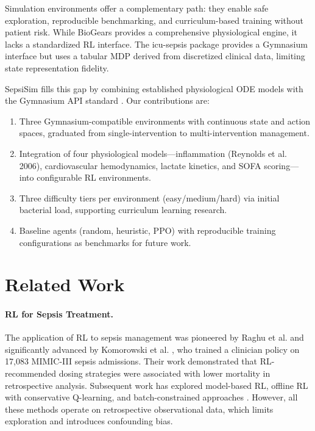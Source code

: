 \documentclass[11pt,a4paper]{article}
\begin{document}
Simulation environments offer a complementary path: they enable safe exploration, reproducible benchmarking, and curriculum-based training without patient risk. While BioGears \citep{mcdaniel2019biogears} provides a comprehensive physiological engine, it lacks a standardized RL interface. The icu-sepsis package \citep{choudhary2024icu} provides a Gymnasium interface but uses a tabular MDP derived from discretized clinical data, limiting state representation fidelity.

SepsiSim fills this gap by combining established physiological ODE models with the Gymnasium API standard \citep{towers2024gymnasium}. Our contributions are:

\begin{enumerate}
    \item Three Gymnasium-compatible environments with continuous state and action spaces, graduated from single-intervention to multi-intervention management.
    \item Integration of four physiological models---inflammation (Reynolds et al. 2006), cardiovascular hemodynamics, lactate kinetics, and SOFA scoring---into configurable RL environments.
    \item Three difficulty tiers per environment (easy/medium/hard) via initial bacterial load, supporting curriculum learning research.
    \item Baseline agents (random, heuristic, PPO) with reproducible training configurations as benchmarks for future work.
\end{enumerate}

\section{Related Work}

\paragraph{RL for Sepsis Treatment.}
The application of RL to sepsis management was pioneered by Raghu et al. \citep{raghu2017deep} and significantly advanced by Komorowski et al. \citep{komorowski2018artificial}, who trained a clinician policy on 17,083 MIMIC-III sepsis admissions. Their work demonstrated that RL-recommended dosing strategies were associated with lower mortality in retrospective analysis. Subsequent work has explored model-based RL, offline RL with conservative Q-learning, and batch-constrained approaches \citep{yu2021reinforcement}. However, all these methods operate on retrospective observational data, which limits exploration and introduces confounding bias.
\end{document}
